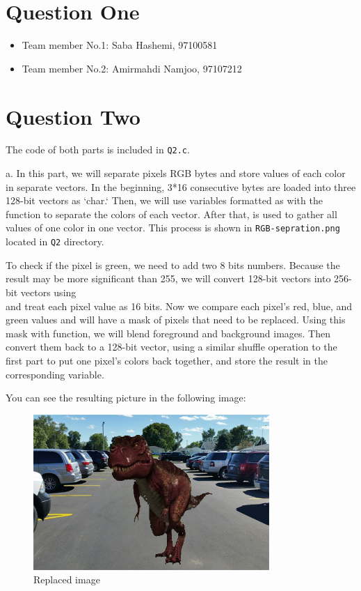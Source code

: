 \documentclass[12pt]{article}
\begin{document}
	
	
	\section{Question One}
	
	\begin{itemize}
		
		\item Team member No.1: Saba Hashemi, 97100581
		\item Team member No.2: Amirmahdi Namjoo, 97107212
	\end{itemize}
	
	\newpage
	
	\section{Question Two}
	
	The code of both parts is included in \Verb+Q2.c+.
	
	a. In this part, we will separate pixels RGB bytes and store values of each color in separate vectors. In the beginning, 3*16 consecutive bytes are loaded into three 128-bit vectors as `char.` Then, we will use variables formatted as  with the  function to separate the colors of each vector. After that,  is used to gather all values of one color in one vector. This process is shown in \Verb+RGB-sepration.png+ located in \Verb+Q2+ directory.
	
	To check if the pixel is green, we need to add two 8 bits numbers. Because the result may be more significant than 255, we will convert 128-bit vectors into 256-bit vectors using\\  and treat each pixel value as 16 bits. Now we compare each pixel's red, blue, and green values and will have a mask of pixels that need to be replaced. Using this mask with  function, we will blend foreground and background images. Then convert them back to a 128-bit vector, using a similar shuffle operation to the first part to put one pixel's colors back together, and store the result in the corresponding variable.
	
	You can see the resulting picture in the following image:
	
	
	\begin{figure}[H]
		\centering
		\includegraphics[width=0.8\textwidth]{./images/Q2/replaced.bmp}	
		\cprotect\caption{Replaced image}
		\label{fig:2-1}
	\end{figure}
	
\end{document}
